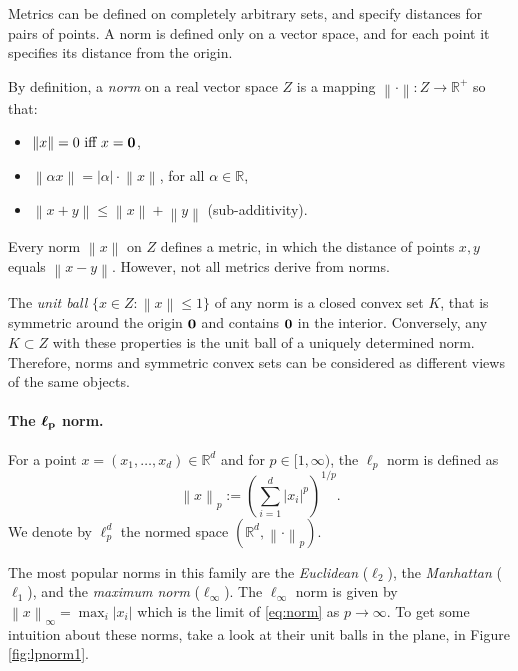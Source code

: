 \documentclass[10pt,a4paper,twoside]{book}
\newcommand{\mbf}[1]{\mbox{\boldmath$\rm{#1}$}}
\newcommand{\rd}{\mathbb{R}^{d}}
\newcommand{\norm}[1]{\left \rVert {#1} \right \rVert}
\theoremstyle{definition}
\theoremstyle{remark}
\begin{document}
Metrics can be defined on completely arbitrary sets, and specify distances for pairs of points. A norm is defined only on a vector space, and for each point it specifies its distance from the origin.

By definition, a \textit{norm} on a real vector space $Z$ is a mapping $\norm{\cdot}: Z \rightarrow \mathbb{R}^+$ so that:
\begin{itemize} \itemsep0em
    \item $\norm{x} = 0 \text{ iff } x= \mbf{0}$,
    \item $\norm{\alpha x} = |\alpha| \cdot \norm{x}$, for all $\alpha \in \mathbb{R}$,
    \item $\norm{x + y} \leq \norm{x} + \norm{y}$ (sub-additivity).
\end{itemize}
Every norm $\norm{x}$ on $Z$ defines a metric, in which the distance of points $x,y$
equals $\norm{x-y}$. However, not all metrics derive from norms.

The \textit{unit ball} $\{x \in Z : \norm{x} \leq 1 \}$ of any norm is a closed convex set $K$, that is symmetric around the origin $\mbf{0}$ and contains $\mbf{0}$ in the interior. Conversely, any $K \subset Z$ with these properties is the unit ball of a uniquely determined norm. Therefore, norms and symmetric convex sets can be considered as different views of the same objects.

\paragraph{The $\mbf{\ell_p}$ norm.} For a point $x = (x_1, \ldots, x_d) \in \rd$ and for $p \in [1, \infty)$, the $\ell_p$ norm is defined as
\begin{equation} \label{eq:norm}
    \norm{x}_p := \left( \sum_{i=1}^d |x_i|^p \right)^{1/p}.
\end{equation}
We denote by $\ell_p^d$ the normed space $(\rd, \norm{\cdot}_p)$.

The most popular norms in this family are the \textit{Euclidean} ($\ell_2$), the \textit{Manhattan} ($\ell_1$), and the \textit{maximum norm} ($\ell_{\infty}$). The $\ell_{\infty}$ norm is given by $\norm{x}_{\infty} = \max_i |x_i|$ which is the limit of \eqref{eq:norm} as $p \rightarrow \infty$. To get some intuition about these norms, take a look at their unit balls in the plane, in Figure \ref{fig:lpnorm1}. 
\end{document}
